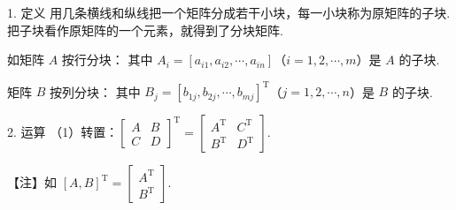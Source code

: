 
\begin{fcard}{1. 定义}
用几条横线和纵线把一个矩阵分成若干小块，每一小块称为原矩阵的子块. 把子块看作原矩阵的一个元素，就得到了分块矩阵.

如矩阵 $A$ 按行分块：
其中 $A_i=[a_{i1},a_{i2},\cdots,a_{in}]$（$i=1,2,\cdots,m$）是 $A$ 的子块.

矩阵 $B$ 按列分块：
其中 $B_j=[b_{1j},b_{2j},\cdots,b_{mj}]^{\mathrm{T}}$（$j=1,2,\cdots,n$）是 $B$ 的子块.
\end{fcard}

\begin{fcard}{2. 运算}
（1）转置：$\begin{bmatrix}A & B\\ C & D\end{bmatrix}^{\mathrm{T}}=\begin{bmatrix}A^{\mathrm{T}} & C^{\mathrm{T}}\\ B^{\mathrm{T}} & D^{\mathrm{T}}\end{bmatrix}$.
\end{fcard}

\begin{fnote}
【注】如 $[A,B]^{\mathrm{T}}=\begin{bmatrix}A^{\mathrm{T}}\\ B^{\mathrm{T}}\end{bmatrix}$.
\end{fnote}

